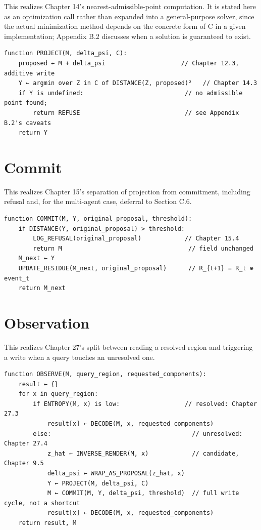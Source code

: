 This realizes Chapter 14's nearest-admissible-point computation. It is stated here as an optimization call rather than expanded into a general-purpose solver, since the actual minimization method depends on the concrete form of C in a given implementation; Appendix B.2 discusses when a solution is guaranteed to exist.

\begin{Verbatim}[breaklines=true, breaksymbolleft={}, fontsize=\small]
function PROJECT(M, delta_psi, C):
    proposed ← M + delta_psi                     // Chapter 12.3, additive write
    Y ← argmin over Z in C of DISTANCE(Z, proposed)²   // Chapter 14.3
    if Y is undefined:                            // no admissible point found;
        return REFUSE                             // see Appendix B.2's caveats
    return Y
\end{Verbatim}

\section{Commit}

This realizes Chapter 15's separation of projection from commitment, including refusal and, for the multi-agent case, deferral to Section C.6.

\begin{Verbatim}[breaklines=true, breaksymbolleft={}, fontsize=\small]
function COMMIT(M, Y, original_proposal, threshold):
    if DISTANCE(Y, original_proposal) > threshold:
        LOG_REFUSAL(original_proposal)            // Chapter 15.4
        return M                                   // field unchanged
    M_next ← Y
    UPDATE_RESIDUE(M_next, original_proposal)      // R_{t+1} = R_t ⊕ event_t
    return M_next
\end{Verbatim}

\section{Observation}

This realizes Chapter 27's split between reading a resolved region and triggering a write when a query touches an unresolved one.

\begin{Verbatim}[breaklines=true, breaksymbolleft={}, fontsize=\small]
function OBSERVE(M, query_region, requested_components):
    result ← {}
    for x in query_region:
        if ENTROPY(M, x) is low:                  // resolved: Chapter 27.3
            result[x] ← DECODE(M, x, requested_components)
        else:                                       // unresolved: Chapter 27.4
            z_hat ← INVERSE_RENDER(M, x)            // candidate, Chapter 9.5
            delta_psi ← WRAP_AS_PROPOSAL(z_hat, x)
            Y ← PROJECT(M, delta_psi, C)
            M ← COMMIT(M, Y, delta_psi, threshold)  // full write cycle, not a shortcut
            result[x] ← DECODE(M, x, requested_components)
    return result, M
\end{Verbatim}

